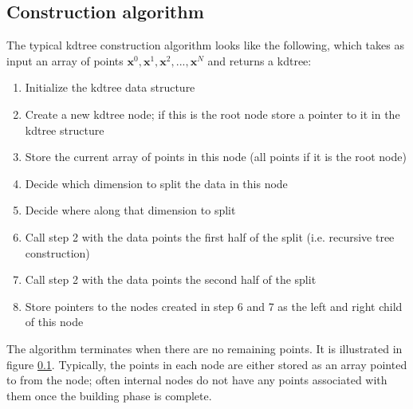\documentclass[journal]{IEEEtran}
\newcommand{\x}{\mathbf{x}}
\begin{document}
\subsection{Construction algorithm}
The typical kdtree construction algorithm looks like the following, which takes
as input an array of points $\x^0,\x^1,\x^2,...,\x^N$ and returns a kdtree:
\begin{enumerate}
    \item Initialize the kdtree data structure
    \item Create a new kdtree node; if this is the root node store a pointer to
          it in the kdtree structure
    \item Store the current array of points in this node (all points if it is
          the root node)
    \item Decide which dimension to split the data in this node
    \item Decide where along that dimension to split
    \item Call step 2 with the data points the first half of the split (i.e.
          recursive tree construction)
    \item Call step 2 with the data points the second half of the split
    \item Store pointers to the nodes created in step 6 and 7 as the left and
          right child of this node
\end{enumerate}
The algorithm terminates when there are no remaining points. It is illustrated
in figure \ref{}. Typically, the points in each node are either stored as an
array pointed to from the node; often internal nodes do not have any points
associated with them once the building phase is complete.
\end{document}
